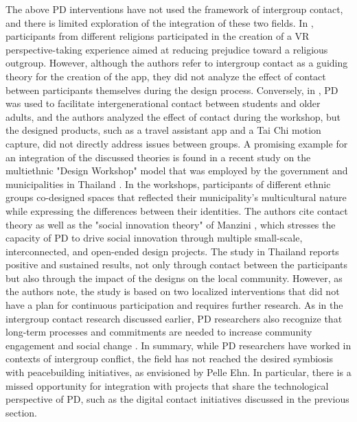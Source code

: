 \documentclass[dissertation,math,vertlayout,pdfa,colorlinks]{aaltoseries}
\begin{document}
The above PD interventions have not used the framework of intergroup contact, and there is limited exploration of the integration of these two fields. In \cite{rifatCohabitantDesignImplementation2024}, participants from different religions participated in the creation of a VR perspective-taking experience aimed at reducing prejudice toward a religious outgroup. However, although the authors refer to intergroup contact as a guiding theory for the creation of the app, they did not analyze the effect of contact between participants themselves during the design process. Conversely, in \cite{cheungEliminatingAgeismHigher2023}, PD was used to facilitate intergenerational contact between students and older adults, and the authors analyzed the effect of contact during the workshop, but the designed products, such as a travel assistant app and a Tai Chi motion capture, did not directly address issues between groups. A promising example for an integration of the discussed theories is found in a recent study on the multiethnic "Design Workshop" model that was employed by the government and municipalities in Thailand \cite{wangThailandsDesignWorkshop2024}. In the workshops, participants of different ethnic groups co-designed spaces that reflected their municipality's multicultural nature while expressing the differences between their identities. The authors cite contact theory as well as the "social innovation theory" of Manzini \cite{manziniDesignWhenEverybody2015}, which stresses the capacity of PD to drive social innovation through multiple small-scale, interconnected, and open-ended design projects. The study in Thailand reports positive and sustained results, not only through contact between the participants but also through the impact of the designs on the local community. However, as the authors note, the study is based on two localized interventions that did not have a plan for continuous participation and requires further research. As in the intergroup contact research discussed earlier, PD researchers also recognize that long-term processes and commitments are needed to increase community engagement and social change \cite{saad-sulonenUnfoldingParticipationTime2018a}. In summary, while PD researchers have worked in contexts of intergroup conflict, the field has not reached the desired symbiosis with peacebuilding initiatives, as envisioned by Pelle Ehn. In particular, there is a missed opportunity for integration with projects that share the technological perspective of PD, such as the digital contact initiatives discussed in the previous section.
\end{document}
